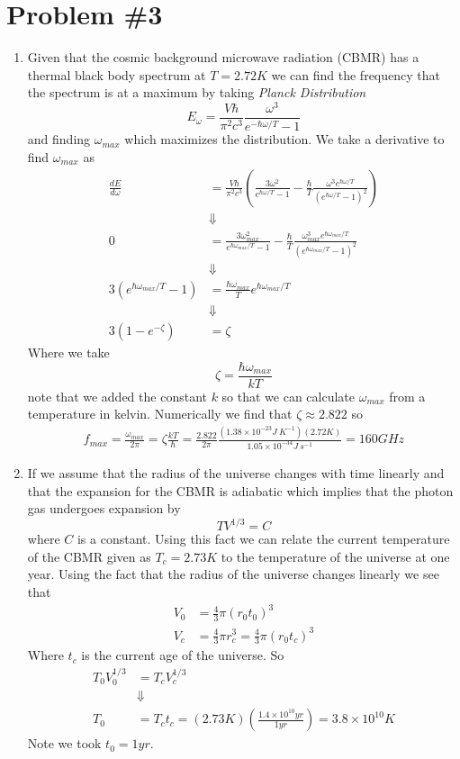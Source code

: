 \documentclass[11pt]{article}
\numberwithin{equation}{section}
\begin{document}
\section{Problem \#3}
\begin{enumerate}[(1)]
\item Given that the cosmic background microwave radiation (CBMR) has a thermal black 
body spectrum at $T=2.72\unit{K}$ we can find the frequency that the spectrum is at a 
maximum by taking \emph{Planck Distribution}
$$E_{\omega} = \frac{V\hbar}{\pi^2c^3}\frac{\omega^3}{e^{-\hbar\omega/T}-1}$$
and finding $\omega_{max}$ which maximizes the distribution. We take a derivative to find
$\omega_{max}$ as
\begin{align*}
\frac{dE}{d\omega} &= \frac{V\hbar}{\pi^2c^3}\left(\frac{3\omega^2}{e^{\hbar\omega/T}-1} - \frac{\hbar}{T}\frac{\omega^3e^{\hbar\omega/T}}{(e^{\hbar\omega/T}-1)^2}\right)\\
&\Downarrow\\
0 &= \frac{3\omega_{max}^2}{e^{\hbar\omega_{max}/T}-1} - \frac{\hbar}{T}\frac{\omega_{max}^3e^{\hbar\omega_{max}/T}}{(e^{\hbar\omega_{max}/T}-1)^2}\\
&\Downarrow\\
3(e^{\hbar\omega_{max}/T}-1) &= \frac{\hbar\omega_{max}}{T}e^{\hbar\omega_{max}/T}\\
&\Downarrow\\
3(1-e^{-\zeta}) &= \zeta
\end{align*}
Where we take 
$$\zeta=\frac{\hbar\omega_{max}}{kT}$$
note that we added the constant $k$ so that we can calculate $\omega_{max}$ from a 
temperature in kelvin. Numerically we find that $\zeta\approx2.822$ so
\begin{align*}
f_{max} = \frac{\omega_{max}}{2\pi} = \zeta\frac{kT}{\hbar} = \frac{2.822}{2\pi}\frac{(1.38\times10^{-23}\unit{J\ K^{-1}})(2.72\unit{K})}{1.05\times10^{-34}\unit{J\ s^{-1}}} = 160\unit{GHz}
\end{align*}

\item If we assume that the radius of the universe changes with time linearly and that the 
expansion for the CBMR is adiabatic which implies that the photon gas undergoes expansion by
$$TV^{1/3} = C$$
where $C$ is a constant. Using this fact we can relate the current temperature of the CBMR
given as $T_c = 2.73\unit{K}$ to the temperature of the universe at one year. Using the fact that
the radius of the universe changes linearly we see that
\begin{align*}
V_0 &= \frac{4}{3}\pi (r_0t_0)^3\\ 
V_c &= \frac{4}{3}\pi r_c^3 = \frac{4}{3}\pi(r_0t_c)^3
\end{align*}
Where $t_c$ is the current age of the universe. So 
\begin{align*}
T_0V_0^{1/3} &=  T_cV_c^{1/3}\\
&\Downarrow\\
T_0 &=  T_ct_c = (2.73\unit{K})\left(\frac{1.4\times10^{10}\unit{yr}}{1\unit{yr}}\right) = 3.8\times10^{10}\unit{K}
\end{align*}
Note we took $t_0=1\unit{yr}$.


\end{enumerate}
\end{document}
